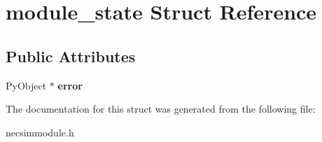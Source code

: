 \hypertarget{structmodule__state}{}\section{module\+\_\+state Struct Reference}
\label{structmodule__state}
\subsection*{Public Attributes}
\begin{DoxyCompactItemize}
\item 
Py\+Object $\ast$ {\bfseries error}\hypertarget{structmodule__state_ae7c076709e128f5d18a6939bd4f0a320}{}\label{structmodule__state_ae7c076709e128f5d18a6939bd4f0a320}

\end{DoxyCompactItemize}


The documentation for this struct was generated from the following file\+:\begin{DoxyCompactItemize}
\item 
necsimmodule.\+h\end{DoxyCompactItemize}

